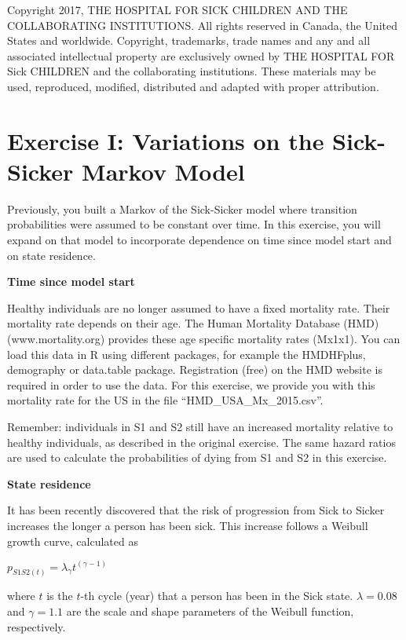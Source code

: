 \documentclass[
]{article}
\begin{document}
Copyright 2017, THE HOSPITAL FOR SICK CHILDREN AND THE COLLABORATING
INSTITUTIONS. All rights reserved in Canada, the United States and
worldwide. Copyright, trademarks, trade names and any and all associated
intellectual property are exclusively owned by THE HOSPITAL FOR Sick
CHILDREN and the collaborating institutions. These materials may be
used, reproduced, modified, distributed and adapted with proper
attribution.

\hypertarget{exercise-i-variations-on-the-sick-sicker-markov-model}{%
\section{Exercise I: Variations on the Sick-Sicker Markov
Model}\label{exercise-i-variations-on-the-sick-sicker-markov-model}}

Previously, you built a Markov of the Sick-Sicker model where transition
probabilities were assumed to be constant over time. In this exercise,
you will expand on that model to incorporate dependence on time since
model start and on state residence.

\textbf{Time since model start}

Healthy individuals are no longer assumed to have a fixed mortality
rate. Their mortality rate depends on their age. The Human Mortality
Database (HMD) (www.mortality.org) provides these age specific mortality
rates (Mx1x1). You can load this data in R using different packages, for
example the HMDHFplus, demography or data.table package. Registration
(free) on the HMD website is required in order to use the data. For this
exercise, we provide you with this mortality rate for the US in the file
``HMD\_USA\_Mx\_2015.csv''.

Remember: individuals in S1 and S2 still have an increased mortality
relative to healthy individuals, as described in the original exercise.
The same hazard ratios are used to calculate the probabilities of dying
from S1 and S2 in this exercise.

\textbf{State residence}

It has been recently discovered that the risk of progression from Sick
to Sicker increases the longer a person has been sick. This increase
follows a Weibull growth curve, calculated as

\(p_{S1S2(t)} = \lambda_\gamma t^{(\gamma-1)}\)

where \(t\) is the \(t\)-th cycle (year) that a person has been in the
Sick state. \(\lambda = 0.08\) and \(\gamma = 1.1\) are the scale and
shape parameters of the Weibull function, respectively.
\end{document}
